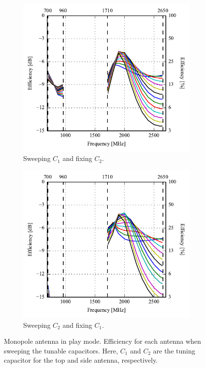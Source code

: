 \begin{figure}[htbp]
    \centering
    \begin{subfigure}{0.49\linewidth}
        \includegraphics{img/tech_sol/monopole/play_mode/efficiency-ac1-csh1}
        \caption{Sweeping $C_1$ and fixing $C_2$.}
    \end{subfigure}
    \hfill
    \begin{subfigure}{0.49\linewidth}
        \includegraphics{img/tech_sol/monopole/play_mode/efficiency-ac2-csh2}
        \caption{Sweeping $C_2$ and fixing $C_1$.}
    \end{subfigure}
    \caption{Monopole antenna in play mode. Efficiency for each antenna when sweeping the tunable capacitors. Here, $C_1$ and $C_2$ are the tuning capacitor for the top and side antenna, respectively.}
    \label{fig:eff_sol1_play}
\end{figure}

